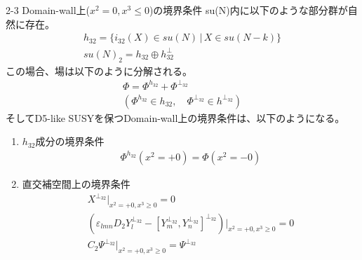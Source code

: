\documentclass[dvipdfmx,a4paper,10.5pt]{article}
\numberwithin{equation}{section}
\begin{document}
\begin{resultbox}{2-3 Domain-wall上($x^{2}=0,x^{3}\leq0$)の境界条件}
    su(N)内に以下のような部分群が自然に存在。
    \begin{gather*}
        h_{32}=\{i_{32}(X)\in su(N)\,|\,X\in su(N-k)\}\\
        su(N)_{2}=h_{32}\oplus h_{32}^{\perp}
    \end{gather*}
    この場合、場は以下のように分解される。
    \begin{gather*}
        \Phi=\Phi^{h_{32}}+\Phi^{\perp_{32}}\\
        (\Phi^{h_{32}}\in h_{32},\quad \Phi^{\perp_{32}}\in h^{\perp_{32}})
    \end{gather*}
    そしてD5-like SUSYを保つDomain-wall上の境界条件は、以下のようになる。
    \begin{enumerate}
        \item $h_{32}$成分の境界条件
        \begin{align*}
            \Phi^{h_{32}}(x^{2}=+0)=\Phi(x^{2}=-0)
        \end{align*}
        \item 直交補空間上の境界条件
        \begin{gather*}
            X^{\perp_{32}}|_{x^{2}=+0,x^{3}\geq 0}=0\\
            (\varepsilon_{lmn}D_{2}Y_{l}^{\perp_{32}}-[Y_{m}^{\perp_{32}},Y_{n}^{\perp_{32}}]^{\perp_{32}})|_{x^{2}=+0,x^{3}\geq 0}=0\\
            C_{2}\Psi^{\perp_{32}}|_{x^{2}=+0,x^{3}\geq 0}=\Psi^{\perp_{32}}
        \end{gather*}
    \end{enumerate}    
\end{resultbox}
\end{document}
